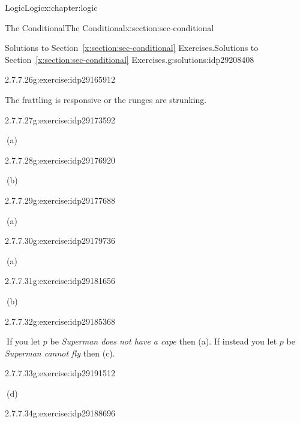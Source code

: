 \documentclass[twoside,10pt,]{book}
\newcommand{\xreffont}{\relax}
\numberwithin{equation}{section}
\begin{document}
\begin{chapterptx}{Logic}{}{Logic}{}{}{x:chapter:logic}
\begin{sectionptx}{The Conditional}{}{The Conditional}{}{}{x:section:sec-conditional}
\begin{solutions-subsection}{Solutions to Section~{\xreffont\ref*{x:section:sec-conditional}} Exercises.}{}{Solutions to Section~{\xreffont\ref*{x:section:sec-conditional}} Exercises.}{}{}{g:solutions:idp29208408}
\begin{exercisegroup}
\begin{divisionsolutioneg}{2.7.7.26}{}{g:exercise:idp29165912}
\par\smallskip%
\noindent\hypertarget{g:solution:idp29171288-main}{}The frattling is responsive or the runges are strunking.\end{divisionsolutioneg}%
\end{exercisegroup}
\par\medskip\noindent
\begin{divisionsolution}{2.7.7.27}{}{g:exercise:idp29173592}%
\par\smallskip%
\noindent\hypertarget{g:solution:idp29171928-main}{}\(\ \)(a)\end{divisionsolution}%
\begin{divisionsolution}{2.7.7.28}{}{g:exercise:idp29176920}%
\par\smallskip%
\noindent\hypertarget{g:solution:idp29172312-main}{}\(\ \)(b)\end{divisionsolution}%
\begin{divisionsolution}{2.7.7.29}{}{g:exercise:idp29177688}%
\par\smallskip%
\noindent\hypertarget{g:solution:idp29180760-main}{}\(\ \)(a)\end{divisionsolution}%
\begin{divisionsolution}{2.7.7.30}{}{g:exercise:idp29179736}%
\par\smallskip%
\noindent\hypertarget{g:solution:idp29181144-main}{}\(\ \)(a)\end{divisionsolution}%
\begin{divisionsolution}{2.7.7.31}{}{g:exercise:idp29181656}%
\par\smallskip%
\noindent\hypertarget{g:solution:idp29182168-main}{}\(\ \)(b)\end{divisionsolution}%
\begin{divisionsolution}{2.7.7.32}{}{g:exercise:idp29185368}%
\par\smallskip%
\noindent\hypertarget{g:solution:idp29190488-main}{}\(\ \)If you let \(p\) be \emph{Superman does not have a cape} then (a).  If instead you let \(p\) be \emph{Superman cannot fly} then (c).\end{divisionsolution}%
\begin{divisionsolution}{2.7.7.33}{}{g:exercise:idp29191512}%
\par\smallskip%
\noindent\hypertarget{g:solution:idp29193560-main}{}\(\ \)(d)\end{divisionsolution}%
\begin{divisionsolution}{2.7.7.34}{}{g:exercise:idp29188696}%
\par\smallskip%

\end{divisionsolution}
\end{solutions-subsection}
\end{sectionptx}
\end{chapterptx}
\end{document}
